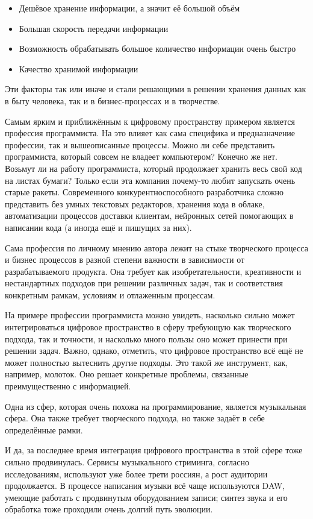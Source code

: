 \documentclass[a4paper, 12pt, oneside]{article}
\begin{document}
\begin{itemize}[label=$\bullet$]
	\item Дешёвое хранение информации, а значит её большой объём
	\item Большая скорость передачи информации
	\item Возможность обрабатывать большое количество информации очень быстро
	\item Качество хранимой информации
\end{itemize}

Эти факторы так или иначе и стали решающими
в решении хранения данных как в быту человека, так и в бизнес-процессах и в творчестве.

Самым ярким и приближённым к цифровому пространству примером является профессия программиста.
На это влияет как сама специфика и предназначение профессии, так и вышеописанные процессы.
Можно ли себе представить программиста, который совсем не владеет компьютером? 
Конечно же нет. Возьмут ли на работу программиста, который продолжает хранить весь свой 
код на листах бумаги? Только если эта компания почему-то любит запускать очень старые ракеты. 
Современного конкурентноспособного разработчика сложно представить без умных текстовых редакторов, 
хранения кода в облаке, автоматизации процессов доставки клиентам, нейронных сетей помогающих 
в написании кода (а иногда ещё и пишущих за них).

Сама профессия по личному мнению автора лежит на стыке творческого процесса и бизнес процессов 
в разной степени важности в зависимости от разрабатываемого продукта.
Она требует как изобретательности, креативности и нестандартных подходов при решении различных задач, 
так и соответствия конкретным рамкам, условиям и отлаженным процессам. 

На примере профессии программиста можно увидеть, насколько сильно может интегрироваться цифровое 
пространство в сферу требующую как творческого подхода, так и точности,
и насколько много пользы оно может принести при решении задач. Важно, однако, отметить, что
цифровое пространство всё ещё не может полностью вытеснить другие подходы. Это такой же инструмент, 
как, например, молоток. Оно решает конкретные проблемы, связанные преимущественно с информацией.

Одна из сфер, которая очень похожа на программирование, является музыкальная сфера. 
Она также требует творческого подхода, но также задаёт в себе определённые рамки.

И да, за последнее время интеграция цифрового пространства в этой сфере тоже сильно продвинулась. 
Сервисы музыкального стриминга, согласно исследованиям, используют уже более трети 
россиян, а рост аудитории продолжается. В процессе написания музыки всё чаще используются 
DAW, умеющие работать с продвинутым оборудованием записи; синтез звука и его обработка тоже проходили 
очень долгий путь эволюции. 
\end{document}
